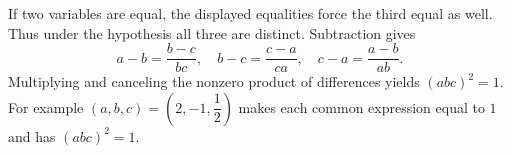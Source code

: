 If two variables are equal, the displayed equalities force the third equal as well. Thus under the hypothesis all three are distinct. Subtraction gives
\[
a-b=\dfrac{b-c}{bc},\quad
b-c=\dfrac{c-a}{ca},\quad
c-a=\dfrac{a-b}{ab}.
\]
Multiplying and canceling the nonzero product of differences yields $\boxed{(abc)^2=1}$. For example $(a,b,c)=(2,-1,\dfrac{1}{2})$ makes each common expression equal to $1$ and has $(abc)^2=1$.
